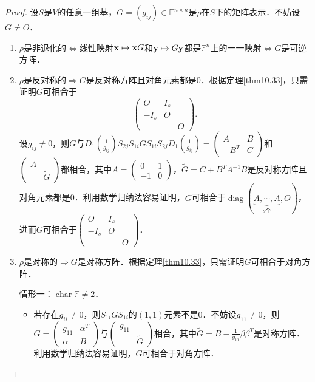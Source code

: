 \documentclass[a4paper,fontset=windows]{ctexbook}
\theoremstyle{definition}
\DeclareMathOperator{\Char}{char}
\DeclareMathOperator{\diag}{diag}
\begin{document}
\begin{proof}
设$S$是$V$的任意一组基，$G=(g_{ij})\in\mathbb{F}^{n\times n}$是$\rho$在$S$下的矩阵表示．不妨设$G\ne O$．
\begin{enumerate}
\item $\rho$是非退化的$\Leftrightarrow$线性映射${\bf x}\mapsto{\bf x}G$和${\bf y}\mapsto G{\bf y}$都是$\mathbb{F}^n$上的一一映射$\Leftrightarrow G$是可逆方阵．

\item $\rho$是反对称的$\Rightarrow G$是反对称方阵且对角元素都是0．根据定理\ref{thm10.33}，只需证明$G$可相合于
$$\begin{pmatrix}O&I_s& \\ -I_s&O& \\ &&O\end{pmatrix}.$$
设$g_{ij}\ne 0$，则$G$与$D_1(\frac{1}{g_{ij}})S_{2j}S_{1i}GS_{1i}S_{2j}D_1(\frac{1}{g_{ij}})=\begin{pmatrix}A&B \\ -B^T&C\end{pmatrix}$和$\begin{pmatrix}A& \\ &\widetilde{G}\end{pmatrix}$都相合，其中$A=\begin{pmatrix}0&1 \\ -1&0\end{pmatrix}$，$\widetilde{G}=C+B^TA^{-1}B$是反对称方阵且对角元素都是0．利用数学归纳法容易证明，$G$可相合于$\diag(\underbrace{A,\cdots,A}_{s\text{个}},O)$，进而$G$可相合于$\begin{pmatrix}O&I_s& \\ -I_s&O& \\ &&O\end{pmatrix}$．

\item $\rho$是对称的$\Rightarrow G$是对称方阵．根据定理\ref{thm10.33}，只需证明$G$可相合于对角方阵．

情形一：$\Char\mathbb{F}\ne 2$．
\begin{itemize}
\item 若存在$g_{ii}\ne 0$，则$S_{1i}GS_{1i}$的$(1,1)$元素不是0．不妨设$g_{11}\ne 0$，则$G=\begin{pmatrix}g_{11}&\alpha^T \\ \alpha&B\end{pmatrix}$与$\begin{pmatrix}g_{11}& \\ &\widetilde{G}\end{pmatrix}$相合，其中$\widetilde{G}=B-\frac{1}{g_{11}}\beta\beta^T$是对称方阵．利用数学归纳法容易证明，$G$可相合于对角方阵．


\end{itemize}
\end{enumerate}
\end{proof}
\end{document}
